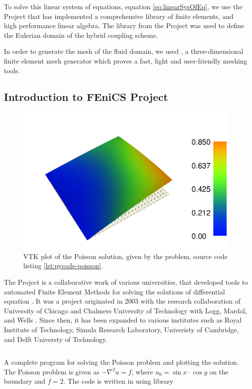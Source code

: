 To solve this linear system of equations, equation \ref{eq:linearSysOfEq}, we use the \fenics Project that has implemented a comprehensive library of finite elements, and high performance linear algebra. The \dolfin library from the \fenics Project was used to define the Eulerian domain of the hybrid coupling scheme.

In order to generate the mesh of the fluid domain, we used \gmsh, a three-dimensional finite element mesh generator which proves a fast, light and user-friendly meshing tools.

\subsection{Introduction to FEniCS Project}

	\begin{figure}[t]
	\centering
	\includegraphics[width=0.5\linewidth]{./figures/eulerian/dolfinExampleFigure-rotated270.pdf}
	\caption{\dolfin VTK plot of the Poisson solution, given by the problem, source code listing \ref{lst:pycode-poisson}.}
	\label{fig:dolfinExampleFigure}
	\end{figure}

The \fenics Project is a collaborative work of various universities, that developed tools to automated Finite Element Methods for solving the solutions of differential equation \cite{FenicsAbout}. It was a project originated in 2003 with the research collaboration of University of Chicago and Chalmers University of Technology with Logg,  Mardal, and Wells \cite{Logg2012a}. Since then, it has been expanded to various institutes such as Royal Institute of Technology, Simula Research Laboratory, Univeristy of Cambridge, and Delft Universty of Technology.

	\begin{listing}[p]
	\inputminted[fontseries=courier,obeytabs,fontsize=\footnotesize,mathescape,linenos,numbersep=5pt,frame=lines,framesep=2mm,xleftmargin=20mm,xrightmargin=20mm]{python}{figures/eulerian/dolfinExample.py}
	\caption{A complete program for solving the Poisson problem and plotting the solution. The Poisson problem is given as $-\nabla^2{u} = f$, where $u_0 = \sin{x}\cdot\cos{y}$ on the boundary and $f=2$. The code is written in \python using  library}
	\label{lst:pycode-poisson}
	\end{listing}

